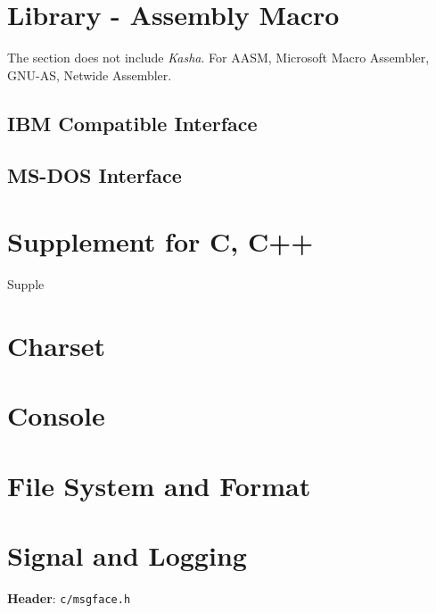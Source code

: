 \section{Library \mbox{-} Assembly Macro}

The section does not include \textit{Kasha}. For AASM, Microsoft Macro Assembler, GNU-AS, Netwide Assembler.



\subsection{IBM Compatible Interface}



\subsection{MS-DOS Interface}



\section{Supplement for C, C++}

{Supple}



\section{Charset}





\section{Console}





\section{File System and Format}





\section{Signal and Logging}

\textbf{Header}: \verb|c/msgface.h|



